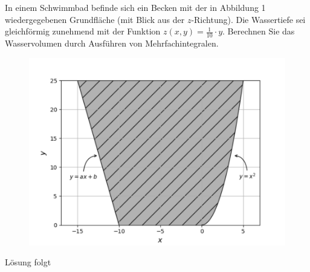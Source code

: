 \documentclass{atistandalonetask}
\begin{document}
	  \begin{atiTask}[
  title = Volumen eines Schwimmbeckens
	]
In einem Schwimmbad befinde sich ein Becken mit der in Abbildung 1 wiedergegebenen Grundfläche (mit Blick aus der $z$-Richtung). Die Wassertiefe sei gleichförmig zunehmend mit der Funktion $z(x,y)=\frac{1}{10}\cdot y$. Berechnen Sie das Wasservolumen durch Ausführen von Mehrfachintegralen.\\[-0.7cm]
\begin{figure}[h]
\centering
\includegraphics[width=0.7\linewidth]{./picture-dreifachintegral}
\label{fig:picture-dreifachintegral}
\end{figure}


\end{atiTask}

 \begin{atiSolution}
   	Lösung folgt
  \end{atiSolution}
\end{document}
